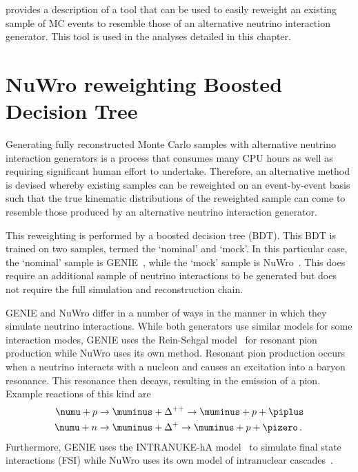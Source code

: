  provides a description of a  tool that can be used to easily reweight an existing sample of MC events to resemble those of an alternative neutrino interaction generator.
This tool is used in the analyses detailed in this chapter.

\section{NuWro reweighting Boosted Decision Tree}
\label{sec:dune_ndrwt:bdt}

Generating fully reconstructed Monte Carlo samples with alternative neutrino interaction generators is a process that consumes many CPU hours as well as requiring significant human effort to undertake.
Therefore, an alternative method is devised whereby existing samples can be reweighted on an event-by-event basis such that the true kinematic distributions of the reweighted sample can come to resemble those produced by an alternative neutrino interaction generator.

This reweighting is performed by a boosted decision tree (BDT).
This BDT is trained on two samples, termed the `nominal' and `mock'.
In this particular case, the `nominal' sample is GENIE~\cite{genie}, while the `mock' sample is NuWro~\cite{nuwro}.
This does require an additional sample of neutrino interactions to be generated but does not require the full simulation and reconstruction chain.

GENIE and NuWro differ in a number of ways in the manner in which they simulate neutrino interactions.
While both generators use similar models for some interaction modes, GENIE uses the Rein-Sehgal model~\cite{reinSehgal} for resonant pion production while NuWro uses its own method.
Resonant pion production occurs when a neutrino interacts with a nucleon and causes an excitation into a baryon resonance. 
This resonance then decays, resulting in the emission of a pion.
Example reactions of this kind are 
\begin{align}
	\numu + p &\rightarrow \muminus + \Delta^{++} \rightarrow \muminus + p + \piplus \\
	\numu + n &\rightarrow \muminus + \Delta^{+} \rightarrow \muminus + p + \pizero \, . 
\end{align}
Furthermore, GENIE uses the INTRANUKE-hA model~\cite{intranuke} to simulate final state interactions (FSI) while NuWro uses its own model of intranuclear cascades~\cite{nuwroCascade}.

